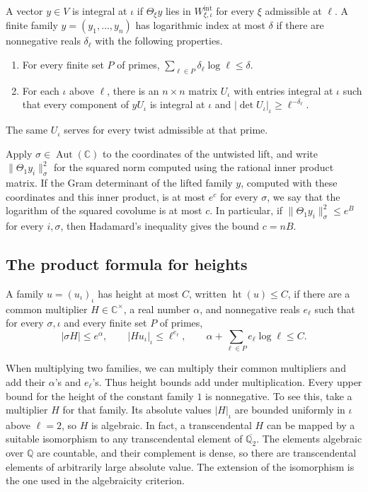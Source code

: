 \begin{definition}
A vector \(y\in V\) is integral at \(\iota\) if \(\Theta_\xi y\) lies in
\(W^{\mathrm{int}}_{\xi,\iota}\) for every \(\xi\) admissible at \(\ell\).
A finite family \(y=(y_1,\ldots,y_n)\) has logarithmic index at most \(\delta\)
if there are nonnegative reals \(\delta_\ell\) with the following properties.
\begin{enumerate}
\item For every finite set \(P\) of primes,
\(\sum_{\ell\in P}\delta_\ell\log\ell\le\delta\).
\item For each \(\iota\) above \(\ell\), there is an \(n\times n\) matrix
\(U_\iota\) with entries integral at \(\iota\) such that every component of
\(yU_\iota\) is integral at \(\iota\) and
\(|\det U_\iota|_\iota\ge\ell^{-\delta_\ell}\).
\end{enumerate}
The same \(U_\iota\) serves for every twist admissible at that prime.
\end{definition}

Apply \(\sigma\in\operatorname{Aut}(\mathbb C)\) to the coordinates of the
untwisted lift, and write \(\|\Theta_1 y_i\|_\sigma^2\) for the squared norm
computed using the rational inner product matrix. If the Gram determinant
of the lifted family \(y\), computed with these coordinates and this inner
product, is at most \(e^c\) for every \(\sigma\), we say that the logarithm of
the squared covolume is at most \(c\). In particular, if
\(\|\Theta_1 y_i\|_\sigma^2\le e^B\) for every \(i,\sigma\), then Hadamard's
inequality gives the bound \(c=nB\).

\subsection{The product formula for heights}

\begin{definition}
A family \(u=(u_\iota)_\iota\) has height at most \(C\), written
\(\operatorname{ht}(u)\le C\), if there are a common multiplier
\(H\in\mathbb C^\times\), a real number \(\alpha\), and nonnegative reals
\(e_\ell\) such that for every \(\sigma,\iota\) and every finite set \(P\)
of primes,
\[
 |\sigma H|\le e^\alpha,\qquad
 |H u_\iota|_\iota\le\ell^{e_\ell},\qquad
 \alpha+\sum_{\ell\in P} e_\ell\log\ell\le C .
\]
\end{definition}

When multiplying two families, we can multiply their common multipliers
and add their \(\alpha\)'s and \(e_\ell\)'s. Thus height bounds add under
multiplication. Every upper bound for the height of the constant family
\(1\) is nonnegative. To see this, take a multiplier \(H\) for that family.
Its absolute values \(|H|_\iota\) are bounded uniformly in \(\iota\) above
\(\ell=2\), so \(H\) is algebraic. In fact, a transcendental \(H\) can be
mapped by a suitable isomorphism to any transcendental element of
\(\overline{\mathbb Q_2}\). The elements algebraic over \(\mathbb Q\)
are countable, and their complement is dense, so there are transcendental
elements of arbitrarily large absolute value. The extension of the
isomorphism is the one used in the algebraicity criterion.

